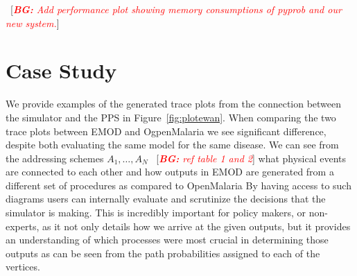\documentclass{article}
\newcommand{\bg}[1]{~{{[{\it \textcolor{red}{{\bf BG:} #1}}]}}}
\begin{document}
\bg{Add performance plot showing memory consumptions of pyprob and our new system.}
\section{Case Study}
\label{sec:casestudy}


We provide examples of the generated trace plots from the connection between the simulator and the PPS in Figure~\ref{fig:plotewan}. 
When comparing the two trace plots between EMOD and OgpenMalaria we see significant difference, despite both evaluating the same model for the same disease. 
We can see from the addressing schemes $A_1, \ldots, A_N$ \bg{ref table 1 and 2} what physical events are connected to each other and how outputs in EMOD are generated from a different set of procedures as compared to OpenMalaria 
By having access to such diagrams users can internally evaluate and scrutinize the decisions that the simulator is making.
This is incredibly important for policy makers, or non-experts, as it not only details how we arrive at the given outputs, but it provides an understanding of which processes were most crucial in determining those outputs as can be seen from the path probabilities assigned to each of the vertices.



% 






\end{document}

